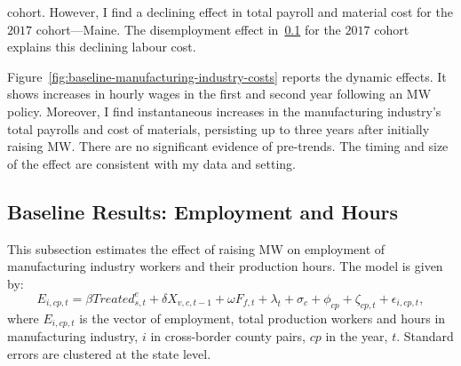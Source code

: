 \documentclass[12pt, english]{article}
\begin{document}
cohort. However, I find a declining effect in total payroll and material cost for the $2017$ cohort---Maine. The disemployment effect in~\ref{subsec:baseline-results-employment-and-hours} for the $2017$ cohort explains this declining labour cost.
    

    Figure~\ref{fig:baseline-manufacturing-industry-costs} reports the dynamic effects. It shows increases in hourly wages in the first and second year following an MW policy. Moreover, I find instantaneous increases in the manufacturing industry's total payrolls and cost of materials, persisting up to three years after initially raising MW. There are no significant evidence of pre-trends. The timing and size of the effect are consistent with my data and setting.

    \subsection{Baseline Results: Employment and Hours}\label{subsec:baseline-results-employment-and-hours}
    This subsection estimates the effect of raising MW on employment of manufacturing industry workers and their production hours. The model is given by:
    \begin{equation}
        E_{i,cp,t} = \beta Treated_{s,t}^e + \delta X_{v,c,t-1} + \omega F_{f,t} + \lambda_{t} + \sigma_{c} + \phi_{cp} + \zeta_{cp,t} + \epsilon_{i,cp,t},\label{eq:baseline-emp-hours}
    \end{equation}
    where $E_{i,cp,t}$ is the vector of employment, total production workers and hours in manufacturing industry, $i$ in cross-border county pairs, $cp$ in the year, $t$. Standard errors are clustered at the state level.
    
\end{document}
